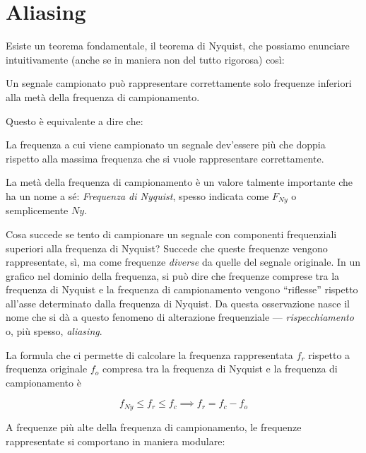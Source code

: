 \section{Aliasing}

Esiste un teorema fondamentale, il teorema di Nyquist, che possiamo enunciare intuitivamente (anche se in maniera non del tutto rigorosa) così:

Un segnale campionato può rappresentare correttamente solo frequenze inferiori alla metà della frequenza di campionamento.

Questo è equivalente a dire che:

La frequenza a cui viene campionato un segnale dev'essere più che doppia rispetto alla massima frequenza che si vuole rappresentare correttamente.

La metà della frequenza di campionamento è un valore talmente importante che ha un nome a sé: \emph{Frequenza di Nyquist}, spesso indicata come $F_{Ny}$ o semplicemente $Ny$.

Cosa succede se tento di campionare un segnale con componenti frequenziali superiori alla frequenza di Nyquist? Succede che queste frequenze vengono rappresentate, sì, ma come frequenze \emph{diverse} da quelle del segnale originale. In un grafico nel dominio della frequenza, si può dire che frequenze comprese tra la frequenza di Nyquist e la frequenza di campionamento vengono ``riflesse'' rispetto all'asse determinato dalla frequenza di Nyquist. Da questa osservazione nasce il nome che si dà a questo fenomeno di alterazione frequenziale --- \emph{rispecchiamento} o, più spesso, \emph{aliasing}.

La formula che ci permette di calcolare la frequenza rappresentata $f_r$ rispetto a frequenza originale $f_o$ compresa tra la frequenza di Nyquist e la frequenza di campionamento è

\begin{equation}
f_{Ny} \leq f_r \leq f_c \implies f_r = f_c - f_o
\end{equation}

A frequenze più alte della frequenza di campionamento, le frequenze rappresentate si comportano in maniera modulare: 











